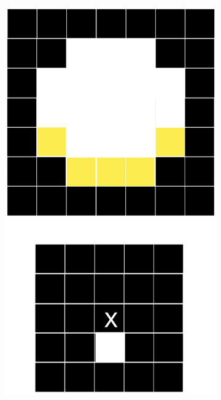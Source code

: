 \documentclass[tikz,14pt,fleqn]{article}
\begin{document}
\begin{figure}[h!]
\begin{subfigure}[b]{0.195\linewidth}
        \includegraphics[width=\linewidth]{fig/4.er4.png}
    \end{subfigure}
    \begin{subfigure}[b]{0.195\linewidth}
        \centering

\end{subfigure}
\end{figure}
\end{document}
